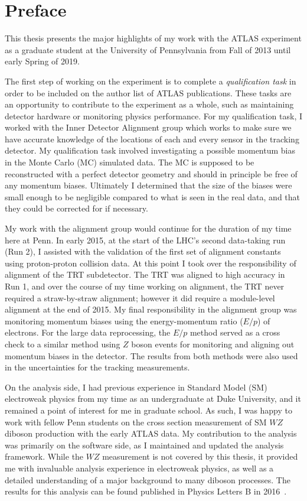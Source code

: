 \chapter{Preface}

This thesis presents the major highlights of my work with the ATLAS experiment as a graduate student at the University of Pennsylvania from Fall of 2013 until early Spring of 2019.

The first step of working on the experiment is to complete a \emph{qualification task} in order to be included on the author list of ATLAS publications.
These tasks are an opportunity to contribute to the experiment as a whole, such as maintaining detector hardware or monitoring physics performance.
For my qualification task, I worked with the Inner Detector Alignment group which works to make sure we have accurate knowledge of the locations of each and every sensor in the tracking detector.
My qualification task involved investigating a possible momentum bias in the Monte Carlo (MC) simulated data.
The MC is supposed to be reconstructed with a perfect detector geometry and should in principle be free of any momentum biases.
Ultimately I determined that the size of the biases were small enough to be negligible compared to what is seen in the real data, and that they could be corrected for if necessary.

My work with the alignment group would continue for the duration of my time here at Penn.
In early 2015, at the start of the LHC's second data-taking run (Run 2), I assisted with the validation of the first set of alignment constants using  proton-proton collision data.
At this point I took over the responsibility of alignment of the TRT subdetector.
The TRT was aligned to high accuracy in Run 1, and over the course of my time working on alignment, the TRT never required a straw-by-straw alignment; however it did require a module-level alignment at the end of 2015.
My final responsibility in the alignment group was monitoring momentum biases using the energy-momentum ratio ($E/p$) of electrons.
For the large data reprocessing, the $E/p$ method served as a cross check to a similar method using $Z$ boson events for monitoring and aligning out momentum biases in the detector.
The results from both methods were also used in the uncertainties for the tracking measurements.

On the analysis side, I had previous experience in Standard Model (SM) electroweak physics from my time as an undergraduate at Duke University, and it remained a point of interest for me in graduate school.
As such, I was happy to work with fellow Penn students on the cross section measurement of SM $WZ$ diboson production with the early  ATLAS data.
My contribution to the analysis was primarily on the software side, as I maintained and updated the analysis framework.
While the $WZ$ measurement is not covered by this thesis, it provided me with invaluable analysis experience in electroweak physics, as well as a detailed understanding of a major background to many diboson processes.
The results for this analysis can be found published in Physics Letters B in 2016~\cite{2016.wz-13tev-physlett}.

